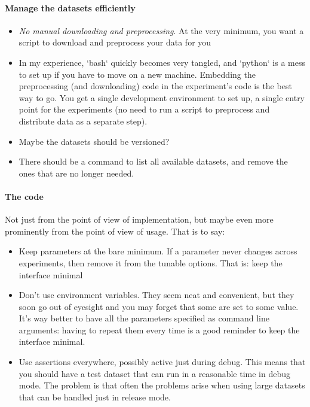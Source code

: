 \documentclass{llncs}
\begin{document}
\paragraph{Manage the datasets efficiently}

\begin{itemize}
\item \emph{No manual downloading and preprocessing}. At the very minimum, you want a
  script to download and preprocess your data for you
\item In my experience, `bash` quickly becomes very tangled, and `python` is a mess
  to set up if you have to move on a new machine. Embedding the preprocessing
  (and downloading) code in the experiment's code is the best way to go. You
  get a single development environment to set up, a single entry point for the
  experiments (no need to run a script to preprocess and distribute data as a
  separate step).
\item Maybe the datasets should be versioned?
\item There should be a command to list all available datasets, and remove the ones
  that are no longer needed.
\end{itemize}

\paragraph{The code}

Not just from the point of view of implementation, but maybe even more
prominently from the point of view of usage. That is to say:

\begin{itemize}
\item Keep parameters at the bare minimum. If a parameter never changes across
  experiments, then remove it from the tunable options. That is: keep the
  interface minimal
\item Don't use environment variables. They seem neat and convenient, but they soon
  go out of eyesight and you may forget that some are set to some value. It's
  way better to have all the parameters specified as command line arguments:
  having to repeat them every time is a good reminder to keep the interface
  minimal.
\item Use assertions everywhere, possibly active just during debug. This means that
  you should have a test dataset that can run in a reasonable time in debug
  mode. The problem is that often the problems arise when using large datasets
  that can be handled just in release mode.
\end{itemize}
\end{document}

